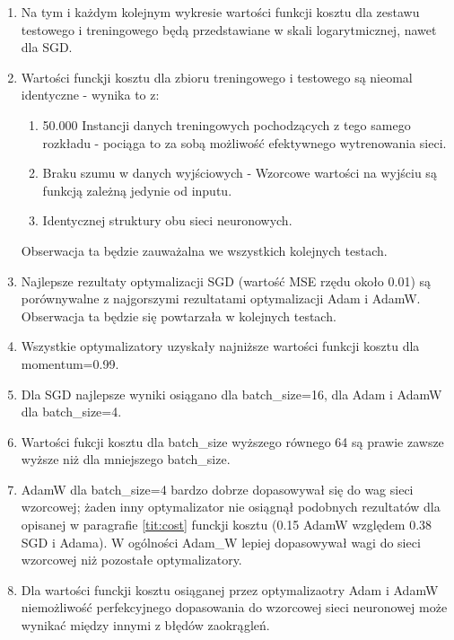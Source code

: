 \documentclass[12pt]{article}
\begin{document}
\begin{enumerate}
	\item Na tym i każdym kolejnym wykresie wartości funkcji kosztu dla zestawu testowego i treningowego będą przedstawiane w skali logarytmicznej, nawet dla SGD.
	\item Wartości funckji kosztu dla zbioru treningowego i testowego są nieomal identyczne - wynika to z:
	\begin{enumerate}
		\item 50.000 Instancji danych treningowych pochodzących z tego samego rozkładu - pociąga to za sobą możliwość efektywnego wytrenowania sieci.
		\item Braku szumu w danych wyjściowych - Wzorcowe wartości na wyjściu są funkcją zależną jedynie od inputu.
		\item Identycznej struktury obu sieci neuronowych.
	\end{enumerate}
	Obserwacja ta będzie zauważalna we wszystkich kolejnych testach.
	\item Najlepsze rezultaty optymalizacji SGD (wartość MSE rzędu około 0.01) są porównywalne z najgorszymi rezultatami optymalizacji Adam i AdamW. Obserwacja ta będzie się powtarzała w kolejnych testach.
	\item Wszystkie optymalizatory uzyskały najniższe wartości funkcji kosztu dla momentum=0.99.
	\item Dla SGD najlepsze wyniki osiągano dla batch\_size=16, dla Adam i AdamW dla batch\_size=4.
	\item Wartości fukcji kosztu dla batch\_size wyższego równego 64 są prawie zawsze wyższe niż dla mniejszego batch\_size.
	\item AdamW dla batch\_size=4 bardzo dobrze dopasowywał się do wag sieci wzorcowej; żaden inny optymalizator nie osiągnął podobnych rezultatów dla opisanej w paragrafie \ref{tit:cost} funckji kosztu (0.15 AdamW względem 0.38 SGD i Adama). W ogólności Adam\_W lepiej dopasowywał wagi do sieci wzorcowej niż pozostałe optymalizatory.
	\item Dla wartości funckji kosztu osiąganej przez optymalizaotry Adam i AdamW niemożliwość perfekcyjnego dopasowania do wzorcowej sieci neuronowej może wynikać między innymi z błędów zaokrągleń.
\end{enumerate}
\end{document}
